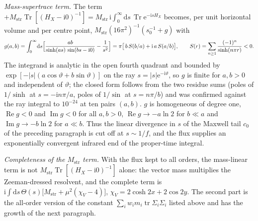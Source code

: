 \emph{Mass-supertrace term.} The term \(+M_{\mathrm{str}}\operatorname{Tr}[(H_X-\mathrm i0)^{-1}]=M_{\mathrm{str}}\,\mathrm i\!\int_0^\infty\!\mathrm ds\,\operatorname{Tr}\mathrm e^{-\mathrm isH_X}\) becomes, per unit horizontal volume and per centre point, \(M_{\mathrm{str}}(16\pi^2)^{-1}(s_0^{-1}+g)\) with
\[
g(a,b)=\int_0^\infty\!\mathrm ds\Bigl[\frac{ab}{\sinh(as)\,\sin(bs-\mathrm i0)}-\frac1{s^2}\Bigr]=\pi\bigl[\,b\,S(b/a)+\mathrm i\,a\,S(a/b)\bigr],\qquad S(r)=\sum_{n\ge1}\frac{(-1)^n}{\sinh(n\pi r)}<0 .
\]
The integrand is analytic in the open fourth quadrant and bounded by \(\exp[-|s|(a\cos\vartheta+b\sin\vartheta)]\) on the ray \(s=|s|\mathrm e^{-\mathrm i\vartheta}\), so \(g\) is finite for \(a,b>0\) and independent of \(\vartheta\); the closed form follows from the two residue sums (poles of \(1/\sinh\) at \(s=-\mathrm in\pi/a\), poles of \(1/\sin\) at \(s=n\pi/b\)) and was confirmed against the ray integral to \(10^{-24}\) at ten pairs \((a,b)\). \(g\) is homogeneous of degree one, \(\operatorname{Re}g<0\) and \(\operatorname{Im}g<0\) for all \(a,b>0\), \(\operatorname{Re}g\to-a\ln2\) for \(b\ll a\) and \(\operatorname{Im}g\to-b\ln2\) for \(a\ll b\). Thus the linear divergence in \(s\) of the Maxwell tail \(c_0\) of the preceding paragraph is cut off at \(s\sim1/f\), and the flux supplies an exponentially convergent infrared end of the proper-time integral.

\emph{Completeness of the \(M_{\mathrm{str}}\) term.} With the flux kept to all orders, the mass-linear term is not \(M_{\mathrm{str}}\operatorname{Tr}[(H_X-\mathrm i0)^{-1}]\) alone: the vector mass multiplies the Zeeman-dressed resolvent, and the complete term is \(\mathrm i\!\int\!\mathrm ds\,\Theta(s)\bigl[M_{\mathrm{str}}+\mu^2(\chi_V-4)\bigr]\), \(\chi_V=2\cosh2x+2\cos2y\). The second part is the all-order version of the constant \(\sum_iw_im_i\operatorname{tr}\Sigma_i\Sigma_i\) listed above and has the growth of the next paragraph.

